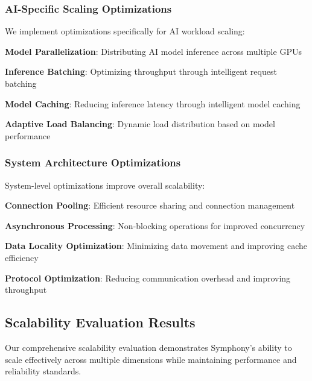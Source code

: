 \subsubsection*{AI-Specific Scaling Optimizations}

We implement optimizations specifically for AI workload scaling:

\begin{expandedlist}
    \item \textbf{Model Parallelization}: Distributing AI model inference across multiple GPUs
    \item \textbf{Inference Batching}: Optimizing throughput through intelligent request batching
    \item \textbf{Model Caching}: Reducing inference latency through intelligent model caching
    \item \textbf{Adaptive Load Balancing}: Dynamic load distribution based on model performance
\end{expandedlist}

\subsubsection*{System Architecture Optimizations}

System-level optimizations improve overall scalability:

\begin{compactlist}
    \item \textbf{Connection Pooling}: Efficient resource sharing and connection management
    \item \textbf{Asynchronous Processing}: Non-blocking operations for improved concurrency
    \item \textbf{Data Locality Optimization}: Minimizing data movement and improving cache efficiency
    \item \textbf{Protocol Optimization}: Reducing communication overhead and improving throughput
\end{compactlist}

\subsection*{Scalability Evaluation Results}

Our comprehensive scalability evaluation demonstrates Symphony's ability to scale effectively across multiple dimensions while maintaining performance and reliability standards.

